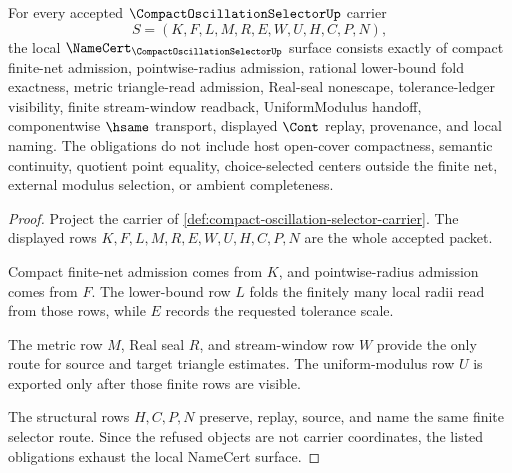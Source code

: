 \begin{theorem}
\label{thm:compact-oscillation-selector-namecert-obligations}
For every accepted $\CompactOscillationSelectorUp$ carrier
$$
S=(K,F,L,M,R,E,W,U,H,C,P,N),
$$
the local $\NameCert_{\CompactOscillationSelectorUp}$ surface consists exactly of compact finite-net admission, pointwise-radius admission, rational lower-bound fold exactness, metric triangle-read admission, Real-seal nonescape, tolerance-ledger visibility, finite stream-window readback, UniformModulus handoff, componentwise $\hsame$ transport, displayed $\Cont$ replay, provenance, and local naming. The obligations do not include host open-cover compactness, semantic continuity, quotient point equality, choice-selected centers outside the finite net, external modulus selection, or ambient completeness.
\end{theorem}
\begin{proof}
Project the carrier of \autoref{def:compact-oscillation-selector-carrier}. The displayed rows $K,F,L,M,R,E,W,U,H,C,P,N$ are the whole accepted packet.

Compact finite-net admission comes from $K$, and pointwise-radius admission comes from $F$. The lower-bound row $L$ folds the finitely many local radii read from those rows, while $E$ records the requested tolerance scale.

The metric row $M$, Real seal $R$, and stream-window row $W$ provide the only route for source and target triangle estimates. The uniform-modulus row $U$ is exported only after those finite rows are visible.

The structural rows $H,C,P,N$ preserve, replay, source, and name the same finite selector route. Since the refused objects are not carrier coordinates, the listed obligations exhaust the local NameCert surface.
\end{proof}

